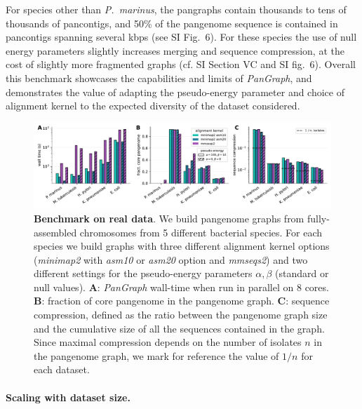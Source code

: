 \documentclass[aps,rmp,preprint,superscriptaddress,10pt,linenumbers]{revtex4-1}
\newcommand{\SIdataBenchmark}{V}
\newcommand{\SIfigBenchmark}{6}
\begin{document}
For species other than \textit{P.~marinus}, the pangraphs contain thousands to tens of thousands of pancontigs, and 50\% of the pangenome sequence is contained in pancontigs spanning several kbps (see SI Fig.~\SIfigBenchmark).
For these species the use of null energy parameters slightly increases merging and sequence compression, at the cost of slightly more fragmented graphs (cf. SI Section {\SIdataBenchmark}C and SI fig.~\SIfigBenchmark).
Overall this benchmark showcases the capabilities and limits of \textit{PanGraph}, and demonstrates the value of adapting the pseudo-energy parameter and choice of alignment kernel to the expected diversity of the dataset considered.


\begin{figure}[htb]
    \includegraphics[width=\textwidth]{figs/panx_benchmark.pdf}
    \caption{{\bf Benchmark on real data}.
        We build pangenome graphs from fully-assembled chromosomes from 5 different bacterial species. For each species we build graphs with three different alignment kernel options (\textit{minimap2} with \textit{asm10} or \textit{asm20} option and \textit{mmseqs2}) and two different settings for the pseudo-energy parameters $\alpha, \beta$ (standard or null values).
        \textbf{A}: \textit{PanGraph} wall-time when run in parallel on 8 cores.
        \textbf{B}: fraction of core pangenome in the pangenome graph.
        \textbf{C}: sequence compression, defined as the ratio between the pangenome graph size and the cumulative size of all the sequences contained in the graph. Since maximal compression depends on the number of isolates $n$ in the pangenome graph, we mark for reference the value of $1/n$ for each dataset.
    }
    \label{fig:panx-benchmark}
\end{figure}

\paragraph*{Scaling with dataset size.}
\end{document}
